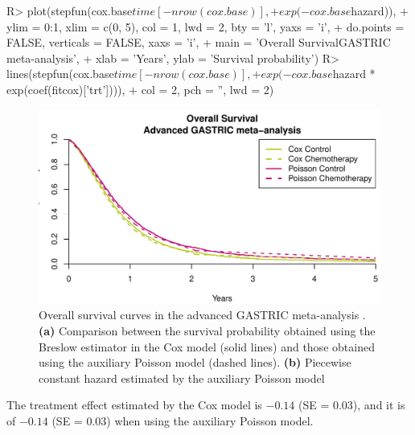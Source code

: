 \documentclass[article,shortnames, nojss]{jss}\usepackage[]{graphicx}\usepackage[]{color}
\begin{document}
\begin{Schunk}
\begin{Sinput}
R>   plot(stepfun(cox.base$time[-nrow(cox.base)], 
+                exp(-cox.base$hazard)),
+        ylim = 0:1, xlim = c(0, 5), col = 1, lwd = 2, bty = 'l', yaxs = 'i',
+        do.points = FALSE, verticals = FALSE, xaxs = 'i',
+        main = 'Overall Survival\nAdvanced GASTRIC meta-analysis',
+        xlab = 'Years', ylab = 'Survival probability')
R>   lines(stepfun(cox.base$time[-nrow(cox.base)],
+                exp(-cox.base$hazard * exp(coef(fitcox)['trt']))),
+        col = 2, pch = '', lwd = 2)
\end{Sinput}
\begin{figure}
\includegraphics[width=\textwidth]{./poissonize-1} \caption{Overall survival curves in the advanced GASTRIC meta-analysis \citep{GASTRIC13}. \textbf{(a)} Comparison between the survival probability obtained using the Breslow estimator in the Cox model (solid lines) and those obtained using the auxiliary Poisson model (dashed lines). \textbf{(b)} Piecewise constant hazard estimated by the auxiliary Poisson model}\label{fig:poissonize}
\end{figure}
\end{Schunk}
The treatment effect estimated by the Cox model is
  \ensuremath{-0.14} (SE = 0.03), 
  and it is of 
  \ensuremath{-0.14} 
  (SE = 0.03)
  when using the auxiliary Poisson model.
\end{document}
